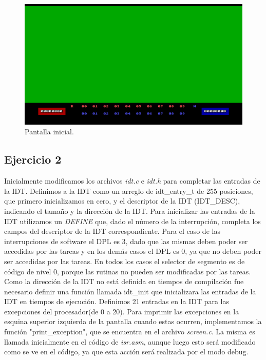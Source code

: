 \documentclass[a4paper]{article}
\begin{document}
\begin{figure}[h]
	\centering
	\includegraphics[scale=0.6]{img/Pantalla.pdf}
	\caption{Pantalla inicial.}
\end{figure}


\subsection{Ejercicio 2}
\justify
Inicialmente modificamos los archivos \textit{idt.c} e \textit{idt.h} para completar las entradas de la IDT. Definimos a la IDT como un arreglo de idt_entry_t de 255 posiciones, que primero inicializamos en cero, y el descriptor de la IDT (IDT_DESC), indicando el tamaño y la dirección de la IDT. Para inicializar las entradas de la IDT utilizamos un \textit{DEFINE} que, dado el número de la interrupción, completa los campos del descriptor de la IDT correspondiente. Para el caso de las interrupciones de software el DPL es 3, dado que las mismas deben poder ser accedidas por las tareas y en los demás casos el DPL es 0, ya que no deben poder ser accedidas por las tareas. En todos los casos el selector de segmento es de código de nivel 0, porque las rutinas no pueden ser modificadas por las tareas. Como la dirección de la IDT no está definida en tiempos de compilación fue necesario definir una función llamada idt_init que inicializara las entradas de la IDT en tiempos de ejecución. Definimos 21 entradas en la IDT para las excepciones del procesador(de 0 a 20).
\justify
Para imprimir las excepciones en la esquina superior izquierda de la pantalla  cuando estas ocurren, implementamos la función "print_exception", que se encuentra en el archivo \textit{screen.c}. La misma es llamada inicialmente en el código de \textit{isr.asm}, aunque luego esto será modificado como se ve en el código, ya que esta acción será realizada por el modo debug. 
\end{document}
